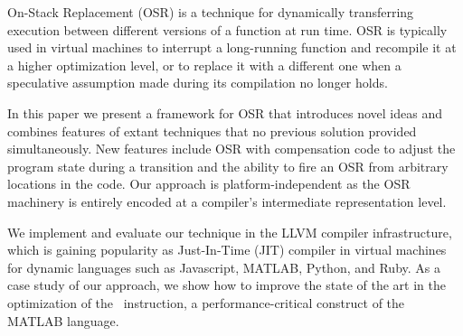 
On-Stack Replacement (OSR) is a technique for dynamically transferring execution between different versions of a function at run time.
OSR is typically used in virtual machines to interrupt a long-running function and recompile it at a higher optimization level, or to replace it with a different one when a speculative assumption made during its compilation no longer holds.

In this paper we present a framework for OSR that introduces novel ideas and combines features of extant techniques that no previous solution provided simultaneously. New features include OSR with compensation code to adjust the program state during a transition and the ability to fire an OSR from arbitrary locations in the code. Our approach is platform-independent as the OSR machinery is entirely encoded at a compiler's intermediate representation level.



We implement and evaluate our technique in the LLVM compiler infrastructure, which is gaining popularity as Just-In-Time (JIT) compiler in virtual machines for dynamic languages such as Javascript, MATLAB, Python, and Ruby. As a case study of our approach, we show how to improve the state of the art in the optimization of the \feval\ instruction, a performance-critical construct of the MATLAB language.

  
  
  
  
  
  
  
  
  